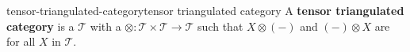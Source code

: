 \begin{topic}{tensor-triangulated-category}{tensor triangulated category}
    A \textbf{tensor triangulated category} is a  $\mathcal{T}$ with a  $\otimes : \mathcal{T} \times \mathcal{T} \to \mathcal{T}$ such that $X \otimes (-)$ and $(-) \otimes X$ are  for all $X$ in $\mathcal{T}$.
\end{topic}
